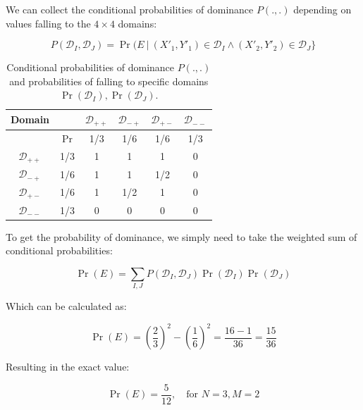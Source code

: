 \documentclass{article}
\theoremstyle{definition}
\begin{document}
\begin{appendices}
We can collect the conditional probabilities of dominance $P(.,.)$ depending on values falling to the $4 \times 4$ domains:

\begin{equation}
    P(\mathcal{D}_I,\mathcal{D}_J) 
    =
    \Pr(E \ | \ (X'_1,Y'_1) \in \mathcal{D}_I \wedge (X'_2,Y'_2) \in \mathcal{D}_J \}
\end{equation}

\begin{table}[H]
\begin{center}
\begin{tabular}{c | c | c c c c} 
 Domain &   & $\mathcal{D}_{++}$ & $\mathcal{D}_{-+}$ & $\mathcal{D}_{+-}$ & $\mathcal{D}_{--}$ \\
 \hline
   & $\Pr$ & 1/3 & 1/6 & 1/6 & 1/3 \\ 
 \hline
 $\mathcal{D}_{++}$ & 1/3 & 1 & 1 & 1 & 0 \\
 $\mathcal{D}_{-+}$ & 1/6 & 1 & 1 & 1/2 & 0 \\
 $\mathcal{D}_{+-}$ & 1/6 & 1 & 1/2 & 1 & 0 \\
 $\mathcal{D}_{--}$ & 1/3 & 0 & 0 & 0 & 0 \\
\end{tabular}
\end{center}
\caption{Conditional probabilities of dominance $P(.,.)$ and probabilities of falling to specific domains $\Pr(\mathcal{D}_I), \Pr(\mathcal{D}_J)$.}
\end{table}

To get the probability of dominance, we simply need to take the weighted sum of conditional probabilities:

\begin{equation}
    \Pr(E)
    =
    \sum_{I,J} 
    P(\mathcal{D}_I,\mathcal{D}_J)
    \Pr(\mathcal{D}_I)
    \Pr(\mathcal{D}_J)
\end{equation}

Which can be calculated as:

\begin{equation}
    \Pr(E)
    =
    \left(\frac{2}{3}\right)^2 - \left(\frac{1}{6}\right)^2 = \frac{16-1}{36} = \frac{15}{36}
\end{equation}

Resulting in the exact value:

\begin{equation}
    \boxed{
    \Pr(E)
    =
    \frac{5}{12}, \quad \text{for } N=3, M=2
    }
\end{equation}


\end{appendices}
\end{document}
